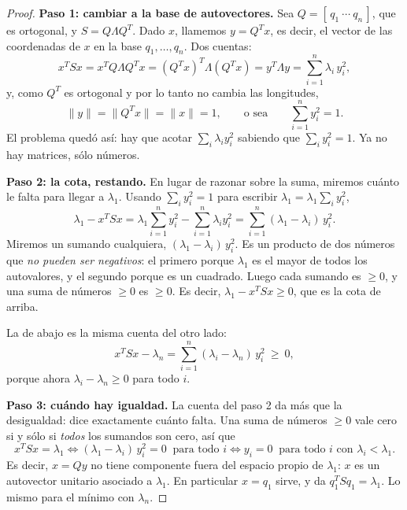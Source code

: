 \begin{proof}
\textbf{Paso 1: cambiar a la base de autovectores.} Sea
$Q=[\,q_1\ \cdots\ q_n\,]$, que es ortogonal, y $S=Q\Lambda Q^T$. Dado $x$,
llamemos $y=Q^Tx$, es decir, el vector de las coordenadas de $x$ en la base
$q_1,\dots,q_n$. Dos cuentas:
\[
x^TSx = x^TQ\Lambda Q^Tx = (Q^Tx)^T\Lambda(Q^Tx) = y^T\Lambda y
= \sum_{i=1}^n \lambda_i\,y_i^2 ,
\]
y, como $Q^T$ es ortogonal y por lo tanto no cambia las longitudes,
\[
\|y\| = \|Q^Tx\| = \|x\| = 1 ,
\qquad\text{o sea}\qquad
\sum_{i=1}^n y_i^2 = 1 .
\]
El problema quedó así: hay que acotar $\sum_i\lambda_iy_i^2$ sabiendo que
$\sum_i y_i^2=1$. Ya no hay matrices, sólo números.

\medskip
\textbf{Paso 2: la cota, restando.} En lugar de razonar sobre la suma, miremos
cuánto le falta para llegar a $\lambda_1$. Usando $\sum_iy_i^2=1$ para escribir
$\lambda_1 = \lambda_1\sum_iy_i^2$,
\[
\lambda_1 - x^TSx
= \lambda_1\sum_{i=1}^n y_i^2 - \sum_{i=1}^n \lambda_i y_i^2
= \sum_{i=1}^n (\lambda_1-\lambda_i)\,y_i^2 .
\]
Miremos un sumando cualquiera, $(\lambda_1-\lambda_i)\,y_i^2$. Es un producto
de dos números que \emph{no pueden ser negativos}: el primero porque
$\lambda_1$ es el mayor de todos los autovalores, y el segundo porque es un
cuadrado. Luego cada sumando es $\ge0$, y una suma de números $\ge0$ es $\ge0$.
Es decir, $\lambda_1-x^TSx\ge0$, que es la cota de arriba.

La de abajo es la misma cuenta del otro lado:
\[
x^TSx - \lambda_n = \sum_{i=1}^n (\lambda_i-\lambda_n)\,y_i^2\ \ge\ 0 ,
\]
porque ahora $\lambda_i-\lambda_n\ge0$ para todo $i$.

\medskip
\textbf{Paso 3: cuándo hay igualdad.} La cuenta del paso 2 da más que la
desigualdad: dice exactamente cuánto falta. Una suma de números $\ge0$ vale
cero si y sólo si \emph{todos} los sumandos son cero, así que
\[
x^TSx=\lambda_1
\iff (\lambda_1-\lambda_i)\,y_i^2=0 \ \text{ para todo } i
\iff y_i=0 \ \text{ para todo } i \text{ con } \lambda_i<\lambda_1 .
\]
Es decir, $x=Qy$ no tiene componente fuera del espacio propio de $\lambda_1$:
$x$ es un autovector unitario asociado a $\lambda_1$. En particular $x=q_1$
sirve, y da $q_1^TSq_1=\lambda_1$. Lo mismo para el mínimo con $\lambda_n$.
\end{proof}

